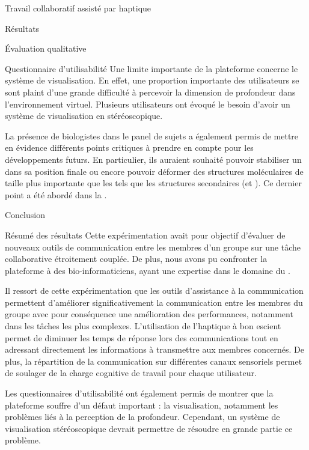 \documentclass[myfrancais,ngerman,english,french]{mythesis}
\begin{document}
\begin{mychapter}{Travail collaboratif assisté par haptique}
\begin{mysection}{Résultats}
\begin{mysubsection}{Évaluation qualitative}
\begin{mysubsubsection}{Questionnaire d'utilisabilité}
					Une limite importante de la plateforme concerne le système de visualisation.
					En effet, une proportion importante des utilisateurs se sont plaint d'une grande difficulté à percevoir la dimension de profondeur dans l'environnement virtuel.
					Plusieurs utilisateurs ont évoqué le besoin d'avoir un système de visualisation en \myThreeD stéréoscopique.

					La présence de biologistes dans le panel de sujets a également permis de mettre en évidence différents points critiques à prendre en compte pour les développements futurs.
					En particulier, ils auraient souhaité pouvoir stabiliser un  dans sa position finale ou encore pouvoir déformer des structures moléculaires de taille plus importante que les  tels que les structures secondaires (\myhelice* et \myfeuillet*).
					Ce dernier point a été abordé dans la .
				\end{mysubsubsection}
			\end{mysubsection}
		\end{mysection}
		\begin{mysection}{Conclusion}
			\begin{mysubsection}{Résumé des résultats}
				Cette expérimentation avait pour objectif d'évaluer de nouveaux outils de communication entre les membres d'un groupe sur une tâche collaborative étroitement couplée.
				De plus, nous avons pu confronter la plateforme \myShaddock à des bio-informaticiens, ayant une expertise dans le domaine du .

				Il ressort de cette expérimentation que les outils d'assistance à la communication permettent d'améliorer significativement la communication entre les membres du groupe avec pour conséquence une amélioration des performances, notamment dans les tâches les plus complexes.
				L'utilisation de l'haptique à bon escient permet de diminuer les temps de réponse lors des communications tout en adressant directement les informations à transmettre aux membres concernés.
				De plus, la répartition de la communication sur différentes canaux sensoriels permet de soulager de la charge cognitive de travail pour chaque utilisateur.

				Les questionnaires d'utilisabilité ont également permis de montrer que la plateforme souffre d'un défaut important : la visualisation, notamment les problèmes liés à la perception de la profondeur.
				Cependant, un système de visualisation stéréoscopique devrait permettre de résoudre en grande partie ce problème.


\end{mysubsection}
\end{mysection}
\end{mychapter}
\end{document}
